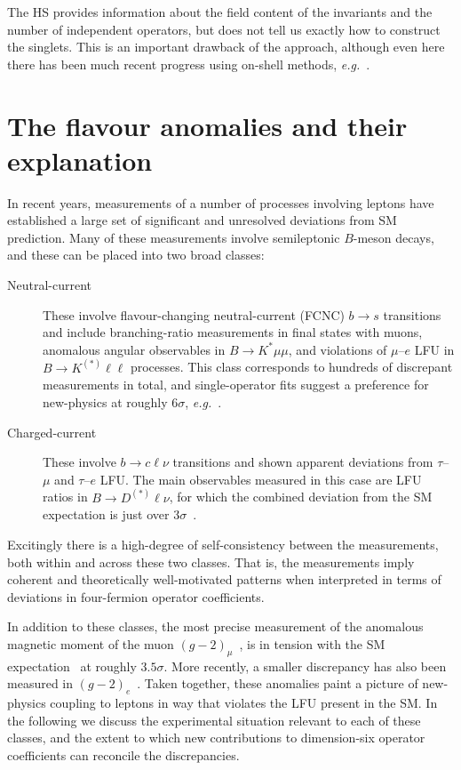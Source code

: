 The HS provides information about the field content of the invariants and the
number of independent operators, but does not tell us exactly how to construct
the singlets. This is an important drawback of the approach, although even here
there has been much recent progress using on-shell methods,
\textit{e.g.}~\cite{Ma:2019gtx, Henning:2019enq, Li:2020gnx, Li:2020xlh}.



\section{The flavour anomalies and their explanation}
\label{sec:ch1-flavour-anomalies}

In recent years, measurements of a number of processes involving leptons have
established a large set of significant and unresolved deviations from SM
prediction. Many of these measurements involve semileptonic $B$-meson decays,
and these can be placed into two broad classes:
\begin{description}
  \item[Neutral-current] These involve flavour-changing neutral-current (FCNC) $b \to s$ transitions and include branching-ratio measurements in final states with muons, anomalous angular observables in $B \to K^{*} \mu\mu$, and violations of $\mu$--$e$ LFU in $B \to K^{(*)} \ell \ell$ processes. This class corresponds to hundreds of discrepant measurements in total, and single-operator fits suggest a preference for new-physics at roughly $6\sigma$, \textit{e.g.}~\cite{Aebischer:2019mlg}.
  \item[Charged-current] These involve $b \to c \ell \nu$ transitions and shown apparent deviations from $\tau$--$\mu$ and $\tau$--$e$ LFU. The main observables measured in this case are LFU ratios in $B \to D^{(*)} \ell \nu$, for which the combined deviation from the SM expectation is just over $3\sigma$~\cite{Amhis:2019ckw}.
\end{description}
Excitingly there is a high-degree of self-consistency between the measurements,
both within and across these two classes. That is, the measurements imply
coherent and theoretically well-motivated patterns when interpreted in terms of
deviations in four-fermion operator coefficients.

In addition to these classes, the most precise measurement of the anomalous
magnetic moment of the muon $(g-2)_{\mu}$~\cite{Bennett:2006fi}, is in tension
with the SM expectation~\cite{Blum:2013xva} at roughly $3.5\sigma$. More
recently, a smaller discrepancy has also been measured in
$(g-2)_{e}$~\cite{Parker_2018}. Taken together, these anomalies paint a picture
of new-physics coupling to leptons in way that violates the LFU present in the
SM. In the following we discuss the experimental situation relevant to each of
these classes, and the extent to which new contributions to dimension-six
operator coefficients can reconcile the discrepancies.

